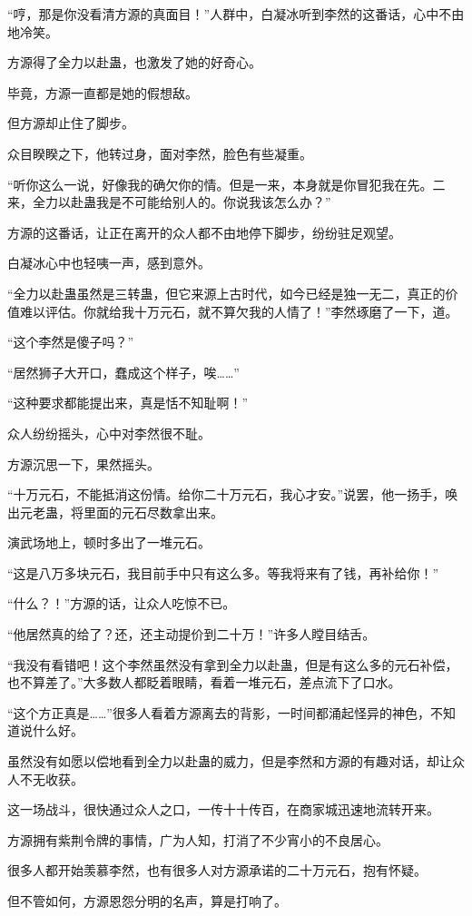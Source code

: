 \begin{this_body}
“哼，那是你没看清方源的真面目！”人群中，白凝冰听到李然的这番话，心中不由地冷笑。

方源得了全力以赴蛊，也激发了她的好奇心。

毕竟，方源一直都是她的假想敌。

但方源却止住了脚步。

众目睽睽之下，他转过身，面对李然，脸色有些凝重。

“听你这么一说，好像我的确欠你的情。但是一来，本身就是你冒犯我在先。二来，全力以赴蛊我是不可能给别人的。你说我该怎么办？”

方源的这番话，让正在离开的众人都不由地停下脚步，纷纷驻足观望。

白凝冰心中也轻咦一声，感到意外。

“全力以赴蛊虽然是三转蛊，但它来源上古时代，如今已经是独一无二，真正的价值难以评估。你就给我十万元石，就不算欠我的人情了！”李然琢磨了一下，道。

“这个李然是傻子吗？”

“居然狮子大开口，蠢成这个样子，唉……”

“这种要求都能提出来，真是恬不知耻啊！”

众人纷纷摇头，心中对李然很不耻。

方源沉思一下，果然摇头。

“十万元石，不能抵消这份情。给你二十万元石，我心才安。”说罢，他一扬手，唤出元老蛊，将里面的元石尽数拿出来。

演武场地上，顿时多出了一堆元石。

“这是八万多块元石，我目前手中只有这么多。等我将来有了钱，再补给你！”

“什么？！”方源的话，让众人吃惊不已。

“他居然真的给了？还，还主动提价到二十万！”许多人瞠目结舌。

“我没有看错吧！这个李然虽然没有拿到全力以赴蛊，但是有这么多的元石补偿，也不算差了。”大多数人都眨着眼睛，看着一堆元石，差点流下了口水。

“这个方正真是……”很多人看着方源离去的背影，一时间都涌起怪异的神色，不知道说什么好。

虽然没有如愿以偿地看到全力以赴蛊的威力，但是李然和方源的有趣对话，却让众人不无收获。

这一场战斗，很快通过众人之口，一传十十传百，在商家城迅速地流转开来。

方源拥有紫荆令牌的事情，广为人知，打消了不少宵小的不良居心。

很多人都开始羡慕李然，也有很多人对方源承诺的二十万元石，抱有怀疑。

但不管如何，方源恩怨分明的名声，算是打响了。


\end{this_body}
